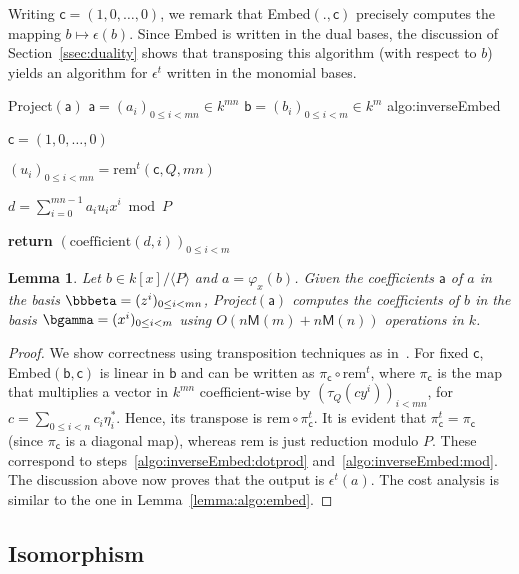 \documentclass{sig-alternate}
\def\M {\ensuremath{\mathsf{M}}}
\def\va {\ensuremath{\mathsf{a}}}
\def\vb {\ensuremath{\mathsf{b}}}
\def\vc {\ensuremath{\mathsf{c}}}
\def\rem {\ensuremath{\mathrm{rem}}}
\def\coeff {\ensuremath{\mathrm{coefficient}}}
\newcounter{algo}
\newenvironment{algorithm_endline}[4]{\small\begin{center}\begin{minipage}{0.48\textwidth}
      \refstepcounter{algo}
      \label{#4}
      \sf
      \rule{\textwidth}{0.2pt}\\
      \makebox[\textwidth][c]{Algorithm~\arabic{algo}:~\textbf{#1}}\\
      \rule[0.5\baselineskip]{\textwidth}{0.2pt}\\

      \vspace{-12pt}

      \parbox{\textwidth}{\textbf{Input} #2}
      \parbox{\textwidth}{\textbf{Output} #3}

\vspace{-7pt}

      \begin{enumerate*}}{\end{enumerate*}
      \vspace{-11pt}
      \rule{\textwidth}{0.2pt}
\end{minipage}\end{center}
}
\newcommand{\ang}[1]{\langle#1\rangle}
\newtheorem{Lemma}{Lemma}
\begin{document}
Writing $\vc=(1,0,\dots,0)$, we remark that Embed$(.,\vc)$ precisely
computes the mapping $b\mapsto \epsilon(b)$. Since Embed is written in
the dual bases, the discussion of Section~\ref{ssec:duality} shows
that transposing this algorithm (with respect to $b$) yields an
algorithm for $\epsilon^t$ written in the monomial bases. 

\vspace{-5pt}

\begin{algorithm_endline}
{Project$(\va)$}
{$\va=(a_i)_{0 \le i < mn} \in k^{mn}$}
{$\vb=(b_i)_{0 \le i < m} \in k^m$}
{algo:inverseEmbed}
\item $\vc=(1,0,\dots,0)$ 
\item  $(u_i)_{0\le i<mn} = \rem^t(\vc,Q,mn)$
\item \label{algo:inverseEmbed:dotprod} $d = \sum_{i=0}^{mn-1} a_i u_i x^i  \bmod P$
\item {\bf return} \label{algo:inverseEmbed:mod} $(\coeff(d,i))_{0 \le i < m}$
\end{algorithm_endline}

\begin{Lemma}\label{lemma:project}
  Let $b \in k[x]/\ang{P}$ and $a=\varphi_x(b)$. Given the
  coefficients $\va$ of $a$ in the basis $\bbbeta=(z^i)_{0 \le i
    < mn}$, {\em Project}$(\va)$ computes the coefficients of $b$ in
  the basis $\bgamma=(x^i)_{0 \le i < m}$ using $O(n\M(m) + n\M(n))$
  operations in $k$.
\end{Lemma}
\begin{proof}
  We show correctness using transposition techniques as
  in~\cite{bostan+lecerf+schost:tellegen}. For fixed $\vc$,
  Embed$(\vb,\vc)$ is linear in $\vb$ and can be written as
  $\pi_\vc\circ\rem^t$, where $\pi_\vc$ is the map that multiplies a
  vector in $k^{mn}$ coefficient-wise by $(\tau_Q(c y^i))_{i<mn}$, for
  $c=\sum_{0 \le i < n} c_i \eta^\ast_i$.  Hence, its transpose is
  $\rem\circ\pi_\vc^t$. It is evident that $\pi_\vc^t=\pi_\vc$ (since
  $\pi_\vc$ is a diagonal map), whereas $\rem$ is just reduction
  modulo $P$. These correspond to
  steps~\ref{algo:inverseEmbed:dotprod}
  and~\ref{algo:inverseEmbed:mod}. The discussion above now proves
  that the output is $\epsilon^t(a)$. The cost analysis is similar to
  the one in Lemma~\ref{lemma:algo:embed}.
\end{proof}


\subsection{Isomorphism} 
\end{document}
